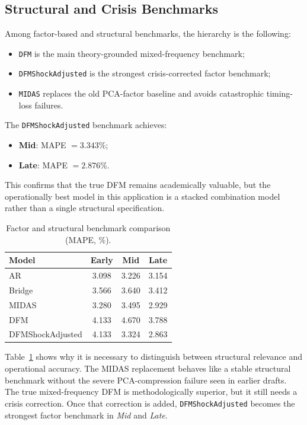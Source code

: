 \documentclass[12pt,a4paper]{article}
\begin{document}
\subsection{Structural and Crisis Benchmarks}

Among factor-based and structural benchmarks, the hierarchy is the following:
\begin{itemize}
    \item \texttt{DFM} is the main theory-grounded mixed-frequency benchmark;
    \item \texttt{DFMShockAdjusted} is the strongest crisis-corrected factor benchmark;
    \item \texttt{MIDAS} replaces the old PCA-factor baseline and avoids catastrophic timing-loss failures.
\end{itemize}

The \texttt{DFMShockAdjusted} benchmark achieves:
\begin{itemize}
    \item \textbf{Mid}: MAPE $= 3.343\%$;
    \item \textbf{Late}: MAPE $= 2.876\%$.
\end{itemize}

This confirms that the true DFM remains academically valuable, but the operationally best model in this application is a stacked combination model rather than a single structural specification.

\begin{table}[H]
    \centering
    \caption{Factor and structural benchmark comparison (MAPE, \%).}
    \label{tab:factor_comparison}
    \begin{tabular}{lccc}
        \hline
        Model & Early & Mid & Late \\
        \hline
        AR & 3.098 & 3.226 & 3.154 \\
        Bridge & 3.566 & 3.640 & 3.412 \\
        MIDAS & 3.280 & 3.495 & 2.929 \\
        DFM & 4.133 & 4.670 & 3.788 \\
        DFMShockAdjusted & 4.133 & 3.324 & 2.863 \\
        \hline
    \end{tabular}
\end{table}

Table~\ref{tab:factor_comparison} shows why it is necessary to distinguish between structural relevance and operational accuracy. The MIDAS replacement behaves like a stable structural benchmark without the severe PCA-compression failure seen in earlier drafts. The true mixed-frequency DFM is methodologically superior, but it still needs a crisis correction. Once that correction is added, \texttt{DFMShockAdjusted} becomes the strongest factor benchmark in \textit{Mid} and \textit{Late}.
\end{document}
